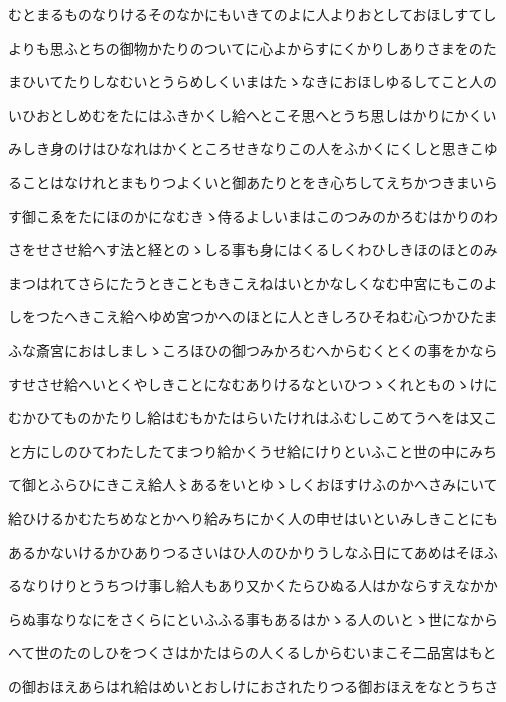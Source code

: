 \documentclass[a4paper,11pt,landscape]{ltjtarticle}
\begin{document}
\par\medskip
むとまるものなりけるそのなかにもいきてのよに人よりおとしておほしすてし
\par\medskip
よりも思ふとちの御物かたりのついてに心よからすにくかりしありさまをのた
\par\medskip
まひいてたりしなむいとうらめしくいまはたゝなきにおほしゆるしてこと人の
\par\medskip
いひおとしめむをたにはふきかくし給へとこそ思へとうち思しはかりにかくい
\par\medskip
みしき身のけはひなれはかくところせきなりこの人をふかくにくしと思きこゆ
\par\medskip
ることはなけれとまもりつよくいと御あたりとをき心ちしてえちかつきまいら
\par\medskip
す御こゑをたにほのかになむきゝ侍るよしいまはこのつみのかろむはかりのわ
\par\medskip
さをせさせ給へす法と経とのゝしる事も身にはくるしくわひしきほのほとのみ
\par\medskip
まつはれてさらにたうときこともきこえねはいとかなしくなむ中宮にもこのよ
\par\medskip
しをつたへきこえ給へゆめ宮つかへのほとに人ときしろひそねむ心つかひたま
\par\medskip
ふな斎宮におはしましゝころほひの御つみかろむへからむくとくの事をかなら
\par\medskip
すせさせ給へいとくやしきことになむありけるなといひつゝくれとものゝけに
\par\medskip
むかひてものかたりし給はむもかたはらいたけれはふむしこめてうへをは又こ
\par\medskip
と方にしのひてわたしたてまつり給かくうせ給にけりといふこと世の中にみち
\par\medskip
て御とふらひにきこえ給人〻あるをいとゆゝしくおほすけふのかへさみにいて
\par\medskip
給ひけるかむたちめなとかへり給みちにかく人の申せはいといみしきことにも
\par\medskip
あるかないけるかひありつるさいはひ人のひかりうしなふ日にてあめはそほふ
\par\medskip
るなりけりとうちつけ事し給人もあり又かくたらひぬる人はかならすえなかか
\par\medskip
らぬ事なりなにをさくらにといふふる事もあるはかゝる人のいとゝ世になから
\par\medskip
へて世のたのしひをつくさはかたはらの人くるしからむいまこそ二品宮はもと
\par\medskip
の御おほえあらはれ給はめいとおしけにおされたりつる御おほえをなとうちさ
\end{document}
